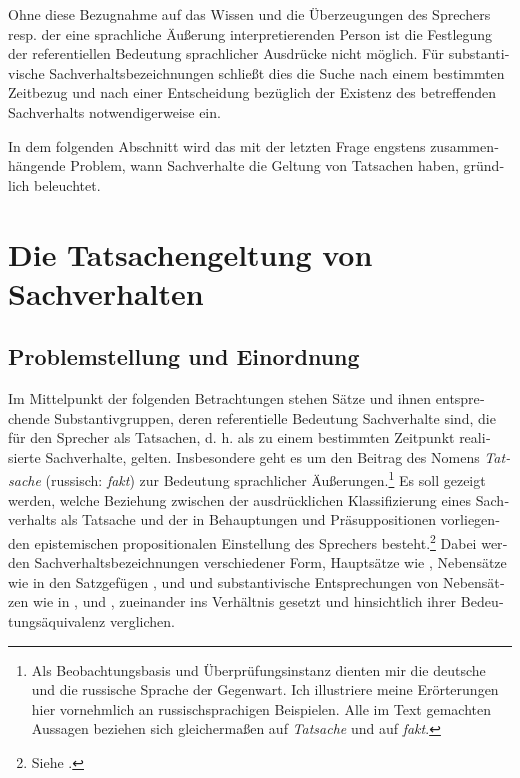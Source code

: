 \documentclass[output=paper]{langscibook}
\begin{document}
\begin{otherlanguage}{german}
\z

\noindent Ohne diese Bezugnahme auf das Wissen und die Überzeugungen des Spre\-chers resp. der eine sprachliche Äußerung interpretierenden Person ist die Festlegung der referentiellen Bedeutung sprachlicher Ausdrücke nicht möglich. Für substantivische Sachverhaltsbezeichnungen schließt dies die Suche nach einem bestimmten Zeitbezug und nach einer Entscheidung bezüglich der Existenz des betreffenden Sachverhalts notwendigerweise ein.

In dem folgenden Abschnitt wird das mit der letzten Frage engstens zusammenhängende Problem, wann Sachverhalte die Geltung von Tatsachen haben, gründlich beleuchtet.

\section{Die Tatsachengeltung von Sachverhalten}\label{sec:zi83:3}

\subsection{Problemstellung und Einordnung}\label{sec:zi83:3.1}

Im Mittelpunkt der folgenden Betrachtungen stehen Sätze und ihnen entsprechende Substantivgruppen, deren referentielle Bedeutung Sachverhalte sind, die für den Sprecher als Tatsachen, d. h. als zu einem bestimmten Zeitpunkt rea\-li\-sier\-te Sachverhalte, gelten. Insbesondere geht es um den Beitrag des Nomens \textit{Tatsache} (russisch: \textit{fakt}) zur Bedeutung sprachlicher Äußerungen.\footnote{Als Beobachtungsbasis und Überprüfungsinstanz dienten mir die deutsche und die russische Sprache der Gegenwart. Ich illustriere meine Erörterungen hier vornehmlich an rus\-sisch\-spra\-chi\-gen Beispielen. Alle im Text gemachten Aussagen beziehen sich gleichermaßen auf \textit{Tatsache} und auf \textit{fakt}.} Es soll gezeigt werden, welche Beziehung zwischen der ausdrücklichen Klassifizierung eines Sachverhalts als Tatsache und der in Behauptungen und Präsuppositionen vorliegenden epistemischen propositionalen Einstellung des Sprechers besteht.\footnote{Siehe \citet{zimmermann1976der-standpunkt-des-sprechers-bezuglich-der-wahrheit-der-mitteilung, Zimmermann82Explizite-und}.} Dabei werden Sachverhaltsbezeichnungen verschiedener Form, Hauptsätze wie , Nebensätze wie in den Satzgefügen ,  und  und sub\-stan\-ti\-vi\-sche Entsprechungen von Nebensätzen wie in ,  und , zueinander ins Verhältnis gesetzt und hinsichtlich ihrer Bedeutungsäquivalenz verglichen.


\end{otherlanguage}
\end{document}

